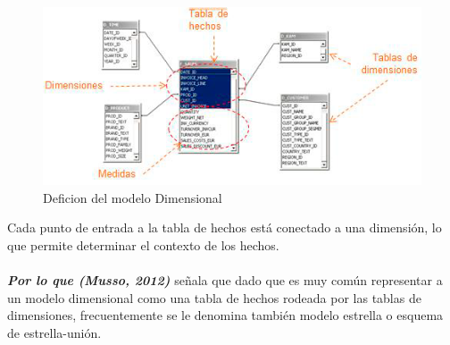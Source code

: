 \documentclass[11pt,a4paper]{article}
\begin{document}
			\begin{figure}[H]
				\begin{center}
					\includegraphics[scale=1.15]{./Imagenes/img05}	
					\caption{Deficion del modelo Dimensional}		
				\end{center}
			\end{figure}
		Cada punto de entrada a la tabla de hechos está conectado a una dimensión, lo que permite determinar el contexto de los hechos.\\
		\\
		\textit{\textbf{Por lo que (Musso, 2012)}} señala que dado que es muy común representar a un modelo dimensional como una tabla de hechos rodeada por las tablas de dimensiones, frecuentemente se le denomina también modelo estrella o esquema de estrella-unión. 
		
	 
	
	
	
	
\end{document}
